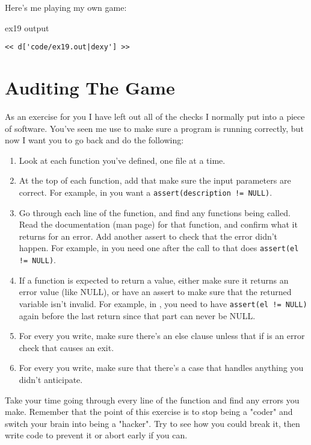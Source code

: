 Here's me playing my own game:

\begin{code}{ex19 output}
\begin{lstlisting}
<< d['code/ex19.out|dexy'] >>
\end{lstlisting}
\end{code}


\section{Auditing The Game}

As an exercise for you I have left out all of the  checks
I normally put into a piece of software.  You've seen me use  to
make sure a program is running correctly, but now I want you to go back
and do the following:

\begin{enumerate}
\item Look at each function you've defined, one file at a time.
\item At the top of each function, add  that make sure
    the input parameters are correct.  For example, in 
    you want a \verb|assert(description != NULL)|.
\item Go through each line of the function, and find any functions
    being called.  Read the documentation (man page) for that function,
    and confirm what it returns for an error.  Add another assert to
    check that the error didn't happen.  For example, in 
    you need one after the call to  that does \verb|assert(el != NULL)|.
\item If a function is expected to return a value, either make sure it returns
    an error value (like NULL), or have an assert to make sure that the returned
    variable isn't invalid.  For example, in , you need
    to have \verb|assert(el != NULL)| again before the last return since
    that part can never be NULL.
\item For every  you write, make sure there's an else
    clause unless that if is an error check that causes an exit.
\item For every  you write, make sure that there's
    a  case that handles anything you didn't anticipate.
\end{enumerate}

Take your time going through every line of the function and find any errors you
make.  Remember that the point of this exercise is to stop being a "coder" and
switch your brain into being a "hacker".  Try to see how you could break it,
then write code to prevent it or abort early if you can.

